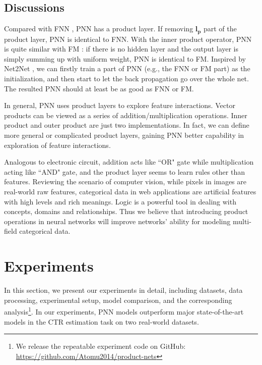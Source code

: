 \documentclass[conference]{IEEEtran}
\newcommand{\bs}{\boldsymbol}
\newcommand{\bl}{\bs{l}}
\newcommand{\bp}{\bs{p}}
\begin{document}
\subsection{Discussions}\label{sec:general-pnn}






Compared with FNN \cite{zhang2016deep}, PNN has a product layer. If removing $\bl_{\bp}$ part of the product layer, PNN is identical to FNN. With the inner product operator, PNN is quite similar with FM \cite{rendle2010factorization}: if there is no hidden layer and the output layer is simply summing up with uniform weight, PNN is identical to FM. Inspired by Net2Net \cite{chen2015net2net}, we can firstly train a part of PNN (e.g., the FNN or FM part) as the initialization, and then start to let the back propagation go over the whole net. The resulted PNN should at least be as good as FNN or FM.

In general, PNN uses product layers to explore feature interactions. Vector products can be viewed as a series of addition/multiplication operations. Inner product and outer product are just two implementations. In fact, we can define more general or complicated product layers, gaining PNN better capability in exploration of feature interactions.

Analogous to electronic circuit, addition acts like ``OR" gate while multiplication acting like ``AND" gate, and the product layer seems to learn rules other than features. Reviewing the scenario of computer vision, while pixels in images are real-world raw features, categorical data in web applications are artificial features with high levels and rich meanings. Logic is a powerful tool in dealing with concepts, domains and relationships. Thus we believe that introducing product operations in neural networks will improve networks' ability for modeling multi-field categorical data.



\section{Experiments}\label{sec:experiment}
In this section, we present our experiments in detail, including datasets, data processing, experimental setup, model comparison, and the corresponding analysis\footnote{We release the repeatable experiment code on GitHub: \url{https://github.com/Atomu2014/product-nets}}. In our experiments, PNN models outperform major state-of-the-art models in the CTR estimation task on two real-world datasets.
\end{document}
